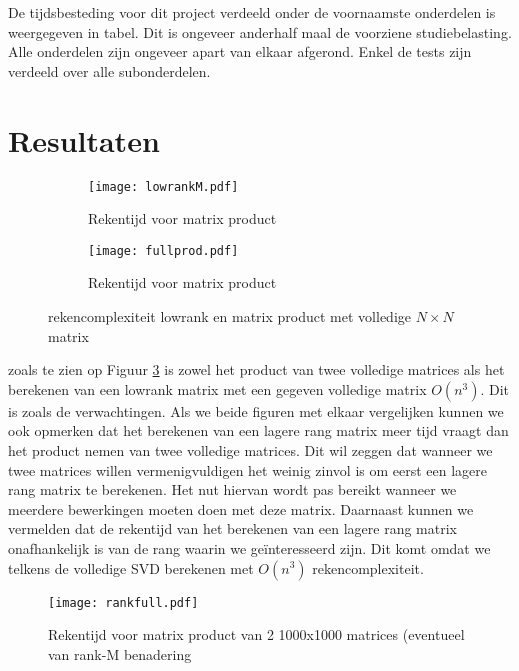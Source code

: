 \documentclass[a4paper]{article}
\begin{document}
De tijdsbesteding voor dit project verdeeld onder de voornaamste onderdelen is weergegeven in tabel. Dit is ongeveer anderhalf maal de voorziene studiebelasting. Alle onderdelen zijn ongeveer apart van elkaar afgerond. Enkel de tests zijn verdeeld over alle subonderdelen.


\section*{Resultaten}

\begin{figure}
\centering
\begin{subfigure}{.48\textwidth}
	\centering
	\texttt{[image: lowrankM.pdf]}
	\caption{Rekentijd voor matrix product}
	\label{lowrank}
\end{subfigure}
\begin{subfigure}{.48\textwidth}
	\centering
	\texttt{[image: fullprod.pdf]}
	\caption{Rekentijd voor matrix product}
	\label{fullprod}
\end{subfigure}
\caption{rekencomplexiteit lowrank en matrix product met volledige $N \times N$ matrix}
\label{o3complex}
\end{figure}

zoals te zien op Figuur \ref{o3complex} is zowel het product van twee volledige matrices als het berekenen van een lowrank matrix met een gegeven volledige matrix \(O(n^3)\). Dit is zoals de verwachtingen. Als we beide figuren met elkaar vergelijken kunnen we ook opmerken dat het berekenen van een lagere rang matrix meer tijd vraagt dan het product nemen van twee volledige matrices. Dit wil zeggen dat wanneer we twee matrices willen vermenigvuldigen het weinig zinvol is om eerst een lagere rang matrix te berekenen. Het nut hiervan wordt pas bereikt wanneer we meerdere bewerkingen moeten doen met deze matrix. Daarnaast kunnen we vermelden dat de rekentijd van het berekenen van een lagere rang matrix onafhankelijk is van de rang waarin we ge\"interesseerd zijn. Dit komt omdat we telkens de volledige SVD berekenen met \(O(n^3)\) rekencomplexiteit.

\begin{figure}
\centering
	\texttt{[image: rankfull.pdf]}
	\caption{Rekentijd voor matrix product van 2 1000x1000 matrices (eventueel van rank-M benadering}
	\label{rankfullplot}
\end{figure}
\end{document}
